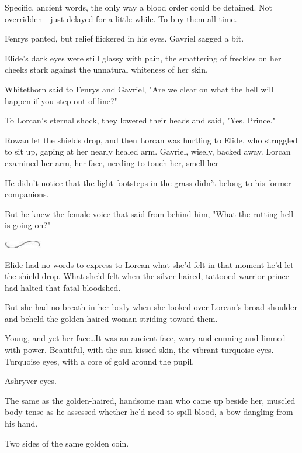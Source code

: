 Specific, ancient words, the only way a blood order could be detained.
Not overridden---just delayed for a little while.
To buy them all time.

Fenrys panted, but relief flickered in his eyes.
Gavriel sagged a bit.

Elide's dark eyes were still glassy with pain, the smattering of freckles on her cheeks stark against the unnatural whiteness of her skin.

Whitethorn said to Fenrys and Gavriel, "Are we clear on what the hell will happen if you step out of line?"

To Lorcan's eternal shock, they lowered their heads and said, "Yes, Prince."

Rowan let the shields drop, and then Lorcan was hurtling to Elide, who struggled to sit up, gaping at her nearly healed arm.
Gavriel, wisely, backed away.
Lorcan examined her arm, her face, needing to touch her, smell her---

He didn't notice that the light footsteps in the grass didn't belong to his former companions.

But he knew the female voice that said from behind him, "What the rutting hell is going on?"

\begin{center}
	\includegraphics[width=0.65in,height=0.13in]{images/seperator}
\end{center}

Elide had no words to express to Lorcan what she'd felt in that moment he'd let the shield drop.
What she'd felt when the silver-haired, tattooed warrior-prince had halted that fatal bloodshed.

But she had no breath in her body when she looked over Lorcan's broad shoulder and beheld the golden-haired woman striding toward them.

Young, and yet her face\ldots It was an ancient face, wary and cunning and limned with power.
Beautiful, with the sun-kissed skin, the vibrant turquoise eyes.
Turquoise eyes, with a core of gold around the pupil.

Ashryver eyes.

The same as the golden-haired, handsome man who came up beside her, muscled body tense as he assessed whether he'd need to spill blood, a bow dangling from his hand.

Two sides of the same golden coin.

